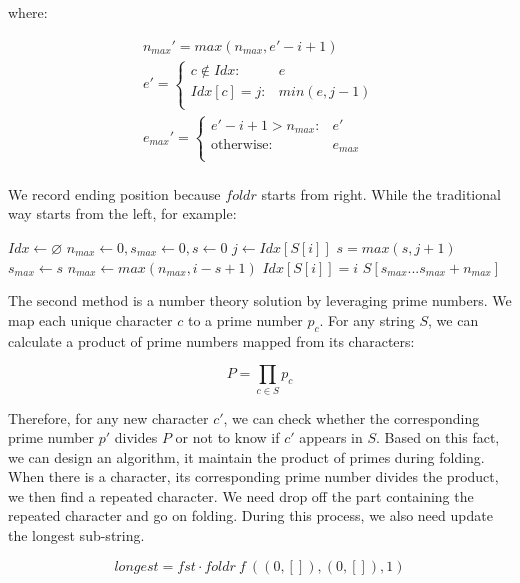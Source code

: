 \documentclass[UTF8]{article}
\begin{document}
\begin{enumerate}
where:

\[ \begin{array}{l}
n_{max}' = max(n_{max}, e' - i + 1) \\
e' = \begin{cases}
  c \notin Idx: & e \\
  Idx[c] = j: & min(e, j - 1) \\
  \end{cases} \\
e_{max}' = \begin{cases}
  e' - i + 1 > n_{max}: & e' \\
  \text{otherwise}: & e_{max} \\
  \end{cases} \\
\end{array} \]

We record ending position because $foldr$ starts from right. While the traditional way starts from the left, for example:

\begin{algorithmic}
  \State $Idx \gets \varnothing$
  \State $n_{max} \gets 0, s_{max} \gets 0, s \gets 0$
      \State $j \gets Idx[S[i]]$
      \State $s = max(s, j + 1)$
    \EndIf
      \State $s_{max} \gets s$
    \EndIf
    \State $n_{max} \gets max(n_{max}, i - s + 1)$
    \State $Idx[S[i]] = i$
  \EndFor
  \State \Return $S[s_{max} ... s_{max} + n_{max}]$
\EndFunction
\end{algorithmic}

The second method is a number theory solution by leveraging prime numbers. We map each unique character $c$ to a prime number $p_c$. For any string $S$, we can calculate a product of prime numbers mapped from its characters:

\[
P = \displaystyle \prod_{c \in S} p_c
\]

Therefore, for any new character $c'$, we can check whether the corresponding prime number $p'$ divides $P$ or not to know if $c'$ appears in $S$. Based on this fact, we can design an algorithm, it maintain the product of primes during folding. When there is a character, its corresponding prime number divides the product, we then find a repeated character. We need drop off the part containing the repeated character and go on folding. During this process, we also need update the longest sub-string.

\[
longest = fst \cdot foldr\ f\ ((0, []), (0, []), 1)
\]


\end{enumerate}
\end{document}
